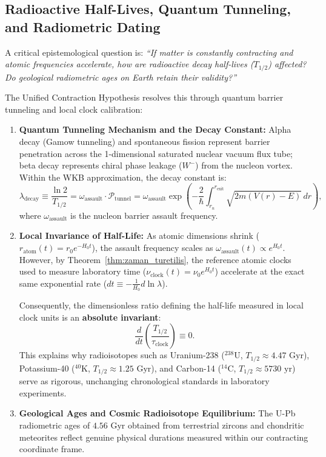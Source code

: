 \subsection{Radioactive Half-Lives, Quantum Tunneling, and Radiometric Dating}
\label{sec:radyoaktif_yari_omur}

A critical epistemological question is: \textit{``If matter is constantly contracting and atomic frequencies accelerate, how are radioactive decay half-lives ($T_{1/2}$) affected? Do geological radiometric ages on Earth retain their validity?''}

The Unified Contraction Hypothesis resolves this through quantum barrier tunneling and local clock calibration:

\begin{enumerate}
    \item \textbf{Quantum Tunneling Mechanism and the Decay Constant:}
          Alpha decay (Gamow tunneling) and spontaneous fission represent barrier penetration across the 1-dimensional saturated nuclear vacuum flux tube; beta decay represents chiral phase leakage ($W^-$) from the nucleon vortex. Within the WKB approximation, the decay constant is:
          \begin{equation}
              \lambda_{\mathrm{decay}} \equiv \frac{\ln 2}{T_{1/2}} = \omega_{\mathrm{assault}} \cdot \mathcal{P}_{\mathrm{tunnel}} = \omega_{\mathrm{assault}} \exp\left( - \frac{2}{\hbar} \int_{r_n}^{r_{\mathrm{exit}}} \sqrt{2m\left(V(r) - E\right)} \, dr \right),
              \label{eq:bozunma_sabiti_genel}
          \end{equation}
          where $\omega_{\mathrm{assault}}$ is the nucleon barrier assault frequency.
    \item \textbf{Local Invariance of Half-Life:}
          As atomic dimensions shrink ($r_{\mathrm{atom}}(t) = r_0 e^{-H_0 t}$), the assault frequency scales as $\omega_{\mathrm{assault}}(t) \propto e^{H_0 t}$. However, by Theorem~\ref{thm:zaman_turetilis}, the reference atomic clocks used to measure laboratory time ($\nu_{\mathrm{clock}}(t) = \nu_0 e^{H_0 t}$) accelerate at the exact same exponential rate ($dt \equiv -\frac{1}{H_0} d\ln\lambda$).

          Consequently, the dimensionless ratio defining the half-life measured in local clock units is an \textbf{absolute invariant}:
          \begin{equation}
              \frac{d}{dt} \left( \frac{T_{1/2}}{\tau_{\mathrm{clock}}} \right) \equiv 0.
              \label{eq:yari_omur_degismezlik}
          \end{equation}
          This explains why radioisotopes such as Uranium-238 ($^{238}\mathrm{U}$, $T_{1/2} \approx 4.47\text{ Gyr}$), Potassium-40 ($^{40}\mathrm{K}$, $T_{1/2} \approx 1.25\text{ Gyr}$), and Carbon-14 ($^{14}\mathrm{C}$, $T_{1/2} \approx 5730\text{ yr}$) serve as rigorous, unchanging chronological standards in laboratory experiments.
    \item \textbf{Geological Ages and Cosmic Radioisotope Equilibrium:}
          The U-Pb radiometric ages of $4.56\text{ Gyr}$ obtained from terrestrial zircons and chondritic meteorites reflect genuine physical durations measured within our contracting coordinate frame.


\end{enumerate}
